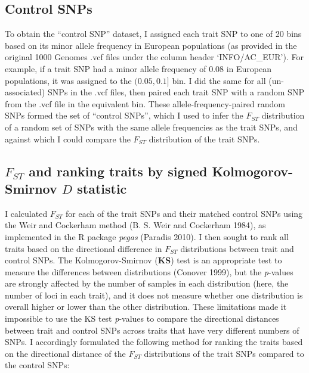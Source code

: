 \documentclass[
]{book}
\begin{document}
\hypertarget{control-snps}{%
\subsection{Control SNPs}\label{control-snps}}

To obtain the ``control SNP'' dataset, I assigned each trait SNP to one of 20 bins based on its minor allele frequency in European populations (as provided in the original 1000 Genomes .vcf files under the column header `INFO/AC\_EUR'). For example, if a trait SNP had a minor allele frequency of 0.08 in European populations, it was assigned to the \((0.05, 0.1]\) bin. I did the same for all (un-associated) SNPs in the .vcf files, then paired each trait SNP with a random SNP from the .vcf file in the equivalent bin. These allele-frequency-paired random SNPs formed the set of ``control SNPs'', which I used to infer the \(F_{ST}\) distribution of a random set of SNPs with the same allele frequencies as the trait SNPs, and against which I could compare the \(F_{ST}\) distribution of the trait SNPs.

\hypertarget{f_st-and-ranking-traits-by-signed-kolmogorov-smirnov-d-statistic}{%
\subsection{\texorpdfstring{\(F_{ST}\) and ranking traits by signed Kolmogorov-Smirnov \(D\) statistic}{F\_\{ST\} and ranking traits by signed Kolmogorov-Smirnov D statistic}}\label{f_st-and-ranking-traits-by-signed-kolmogorov-smirnov-d-statistic}}

I calculated \(F_{ST}\) for each of the trait SNPs and their matched control SNPs using the Weir and Cockerham method (B. S. Weir and Cockerham 1984), as implemented in the R package \emph{pegas} (Paradis 2010). I then sought to rank all traits based on the directional difference in \(F_{ST}\) distributions between trait and control SNPs. The Kolmogorov-Smirnov (\textbf{KS}) test is an appropriate test to measure the differences between distributions (Conover 1999), but the \emph{p}-values are strongly affected by the number of samples in each distribution (here, the number of loci in each trait), and it does not measure whether one distribution is overall higher or lower than the other distribution. These limitations made it impossible to use the KS test \emph{p}-values to compare the directional distances between trait and control SNPs across traits that have very different numbers of SNPs. I accordingly formulated the following method for ranking the traits based on the directional distance of the \(F_{ST}\) distributions of the trait SNPs compared to the control SNPs:
\end{document}
